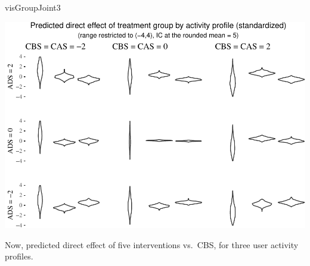 \documentclass[
  10pt,
  dvipsnames,enabledeprecatedfontcommands]{scrartcl}
\newenvironment{Shaded}{\begin{snugshade}}{\end{snugshade}}
\newcommand{\NormalTok}[1]{#1}
\begin{document}
\begin{Shaded}
\begin{Highlighting}[]
\NormalTok{visGroupJoint3}
\end{Highlighting}
\end{Shaded}

\begin{center}\includegraphics[width=1\linewidth]{bayesianReport3_files/figure-latex/unnamed-chunk-17-1} \end{center}
\normalsize

Now, predicted direct effect of five interventions vs.~\textsf{CBS}, for
three user activity profiles.

\vspace{1mm}
\footnotesize
\end{document}
